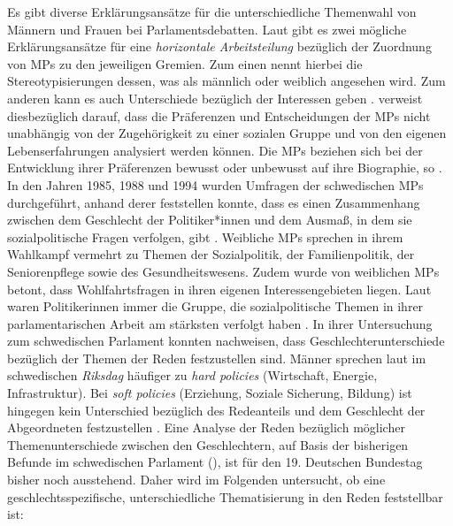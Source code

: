 \documentclass[12pt, 
    twoside=false, 
    bibliography=totoc, 
    numbers=endperiod, 
    headings=normal, 
    toc=chapterentrydotfill
    ]{scrbook}
\begin{document}
Es gibt diverse Erklärungsansätze für die unterschiedliche Themenwahl von Männern und Frauen bei Parlamentsdebatten. Laut \textcite{wangnerud_1996}  gibt es zwei mögliche Erklärungsansätze für eine \emph{horizontale Arbeitsteilung} bezüglich der Zuordnung von MPs zu den jeweiligen Gremien. Zum einen nennt \citeauthor{wangnerud_1996} hierbei die Stereotypisierungen dessen, was als männlich oder weiblich angesehen wird. Zum anderen kann es auch Unterschiede bezüglich der Interessen geben \parencite{wangnerud_1996}.   \citeauthor{back_2014} verweist diesbezüglich darauf, dass die Präferenzen und Entscheidungen der MPs nicht unabhängig von der Zugehörigkeit zu einer sozialen Gruppe und von den eigenen Lebenserfahrungen analysiert werden können. Die MPs beziehen sich bei der Entwicklung ihrer Präferenzen bewusst oder unbewusst auf ihre Biographie, so \textcite[507]{back_2014}. 
In den Jahren 1985, 1988 und 1994 wurden Umfragen der schwedischen MPs durchgeführt, anhand derer \textcite[81]{wangnerud_2000} feststellen konnte, dass es einen Zusammenhang zwischen dem Geschlecht der Politiker*innen und dem Ausmaß, in dem sie sozialpolitische Fragen verfolgen, gibt \parencites[506]{back_2014}[82]{wangnerud_2000}. Weibliche MPs sprechen in ihrem Wahlkampf vermehrt zu Themen der Sozialpolitik, der Familienpolitik, der Seniorenpflege sowie des Gesundheitswesens. Zudem wurde von weiblichen MPs betont, dass Wohlfahrtsfragen in ihren eigenen Interessengebieten liegen. Laut \textcite[82]{wangnerud_2000} waren Politikerinnen immer die Gruppe, die sozialpolitische Themen in ihrer parlamentarischen Arbeit am stärksten verfolgt haben \parencites[vgl.][507]{back_2014}.
In ihrer Untersuchung zum schwedischen Parlament konnten \textcite{back_2014} nachweisen, dass Geschlechterunterschiede bezüglich der Themen der Reden festzustellen sind. Männer sprechen laut \textcite{back_2014} im schwedischen \emph{Riksdag} häufiger zu \emph{hard policies} (Wirtschaft, Energie, Infrastruktur). Bei \emph{soft policies} (Erziehung, Soziale Sicherung, Bildung) ist hingegen kein Unterschied bezüglich des Redeanteils und dem Geschlecht der Abgeordneten festzustellen \parencite[514f.]{back_2014}. Eine Analyse der Reden bezüglich möglicher Themenunterschiede zwischen den Geschlechtern, auf Basis der bisherigen Befunde im schwedischen Parlament (\parencites{wangnerud_2000}{wangnerud_2009}{back_2014}), ist für den 19. Deutschen Bundestag bisher noch ausstehend. Daher wird im Folgenden untersucht, ob eine geschlechtsspezifische, unterschiedliche Thematisierung in den Reden feststellbar ist: 
\end{document}
